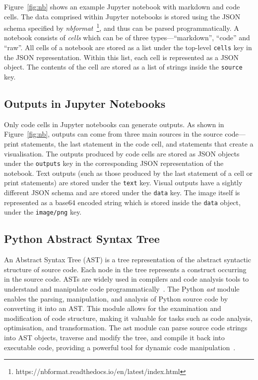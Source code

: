 Figure~\ref{fig:nb} shows an example Jupyter notebook with markdown and code cells. The data comprised within Jupyter notebooks is stored using the JSON schema specified by \emph{nbformat}~\footnote{https://nbformat.readthedocs.io/en/latest/index.html}, and thus can be parsed programmatically. A notebook consists of \emph{cells} which can be of three types---``markdown'', ``code'' and ``raw''. All cells of a notebook are stored as a list under the top-level \lstinline[language={}]$cells$ key in the JSON representation. Within this list, each cell is represented as a JSON object. The contents of the cell are stored as a list of strings inside the \lstinline[language={}]$source$ key.

\subsection{Outputs in Jupyter Notebooks}

Only code cells in Jupyter notebooks can generate outputs. As shown in Figure~\ref{fig:nb}, outputs can come from three main sources in the source code---print statements, the last statement in the code cell, and statements that create a visualisation. The outputs produced by code cells are stored as JSON objects under the \lstinline[language={}]$outputs$ key in the corresponding JSON representation of the notebook. Text outputs (such as those produced by the last statement of a cell or print statements) are stored under the \lstinline[language={}]$text$ key. Visual outputs have a sightly different JSON schema and are stored under the \lstinline[language={}]$data$ key. The image itself is represented as a base64 encoded string which is stored inside the \lstinline[language={}]$data$ object, under the \lstinline[language={}]$image/png$ key.

\subsection{Python Abstract Syntax Tree}


An Abstract Syntax Tree (AST) is a tree representation of the abstract syntactic structure of source code. Each node in the tree represents a construct occurring in the source code. ASTs are widely used in compilers and code analysis tools to understand and manipulate code programmatically~\cite{wikipedia2024abstract}. The Python \emph{ast} module enables the parsing, manipulation, and analysis of Python source code by converting it into an AST. This module allows for the examination and modification of code structure, making it valuable for tasks such as code analysis, optimisation, and transformation. The ast module can parse source code strings into AST objects, traverse and modify the tree, and compile it back into executable code, providing a powerful tool for dynamic code manipulation~\cite{pythonast}.

